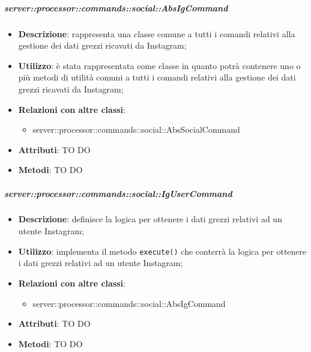         \subparagraph{server::processor::commands::social::AbsIgCommand} %
        \label{subp:bdsm_app_server_processor_commands_social_absigcommand}
        \begin{itemize}
          \item \textbf{Descrizione}: rappresenta una classe comune a tutti i comandi relativi alla gestione dei dati grezzi ricavati da Instagram;
          \item \textbf{Utilizzo}: è stata rappresentata come classe in quanto potrà contenere uno o più metodi di utilità comuni a tutti i comandi relativi alla gestione dei dati grezzi ricavati da Instagram;
          \item \textbf{Relazioni con altre classi}:
            \begin{itemize}
              \item server::processor::commands::social::AbsSocialCommand
            \end{itemize}
			\item \textbf{Attributi}: TO DO
			\item \textbf{Metodi}: TO DO
        \end{itemize}

        \subparagraph{server::processor::commands::social::IgUserCommand} %
        \label{subp:bdsm_app_server_processor_commands_social_igusercommand}
        \begin{itemize}
          \item \textbf{Descrizione}: definisce la logica per ottenere i dati grezzi relativi ad un utente Instagram;
          \item \textbf{Utilizzo}: implementa il metodo \texttt{execute()} che conterrà la logica per ottenere i dati grezzi relativi ad un utente Instagram;
          \item \textbf{Relazioni con altre classi}:
            \begin{itemize}
              \item server::processor::commands::social::AbsIgCommand
            \end{itemize}
			\item \textbf{Attributi}: TO DO
			\item \textbf{Metodi}: TO DO
        \end{itemize}

